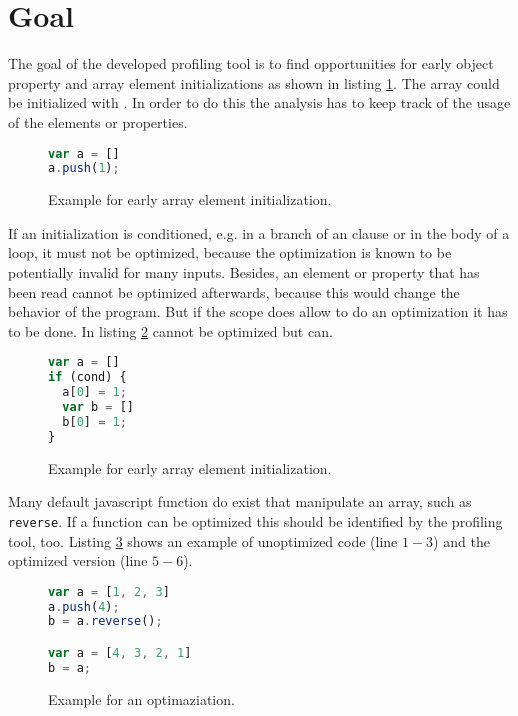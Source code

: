 \section{Goal}

The goal of the developed profiling tool is to find opportunities for early object property and array element initializations as shown in listing \ref{list:example1}. The array  could be initialized with \js{[1]}. In order to do this the analysis has to keep track of the usage of the elements or properties.

\begin{figure}
\begin{lstlisting}[language=Javascript]
var a = []
a.push(1);
\end{lstlisting}
\caption{Example for early array element initialization.}\label{list:example1}
\end{figure}

If an initialization is conditioned, e.g. in a branch of an  clause or in the body of a loop, it must not be optimized, because the optimization is known to be potentially invalid for many inputs. Besides, an element or property that has been read cannot be optimized afterwards, because this would change the behavior of the program. But if the scope does allow to do an optimization it has to be done. In listing \ref{list:example4}  cannot be optimized but  can.

\begin{figure}
\begin{lstlisting}[language=Javascript]
var a = []
if (cond) {
  a[0] = 1;
  var b = []
  b[0] = 1;
}
\end{lstlisting}
\caption{Example for early array element initialization.}\label{list:example4}
\end{figure}

Many default javascript function do exist that manipulate an array, such as \texttt{reverse}. If a function can be optimized this should be identified by the profiling tool, too. Listing \ref{list:example2} shows an example of unoptimized code (line $1-3$) and the optimized version (line $5-6$).

\begin{figure}
\begin{lstlisting}[language=Javascript]
var a = [1, 2, 3]
a.push(4);
b = a.reverse();

var a = [4, 3, 2, 1]
b = a;
\end{lstlisting}
\caption{Example for an optimaziation.}\label{list:example2}
\end{figure}

